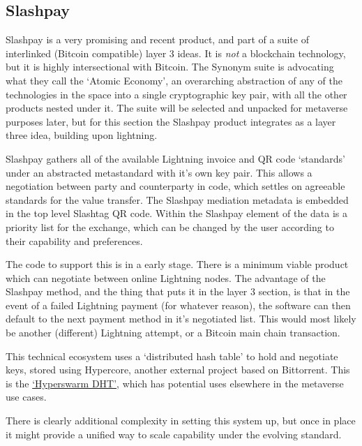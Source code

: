 \subsection{Slashpay}
Slashpay is a very promising and recent product, and part of a suite of interlinked (Bitcoin compatible) layer 3 ideas. It is \textit{not} a blockchain technology, but it is highly intersectional with Bitcoin. The Synonym suite is advocating what they call the `Atomic Economy', an overarching abstraction of any of the technologies in the space into a single cryptographic key pair, with all the other products nested under it. The suite will be selected and unpacked for metaverse purposes later, but for this section the Slashpay product integrates as a layer three idea, building upon lightning. \par
Slashpay gathers all of the available Lightning invoice and QR code `standards' under an abstracted metastandard with it's own key pair. This allows a negotiation between party and counterparty in code, which settles on agreeable standards for the value transfer. The Slashpay mediation metadata is embedded in the top level Slashtag QR code. Within the Slashpay element of the data is a priority list for the exchange, which can be changed by the user according to their capability and preferences.\par 
The code to support this is in a early stage. There is a minimum viable product which can negotiate between online Lightning nodes. The advantage of the Slashpay method, and the thing that puts it in the layer 3 section, is that in the event of a failed Lightning payment (for whatever reason), the software can then default to the next payment method in it's negotiated list. This would most likely be another (different) Lightning attempt, or a Bitcoin main chain transaction.\par
This technical ecosystem uses a `distributed hash table' to hold and negotiate keys, stored using Hypercore, another external project based on Bittorrent. This is the \href{https://hypercore-protocol.org/protocol/#hyperswarm}{`Hyperswarm DHT'}, which has potential uses elsewhere in the metaverse use cases.\par
There is clearly additional complexity in setting this system up, but once in place it might provide a unified way to scale capability under the evolving standard.  
